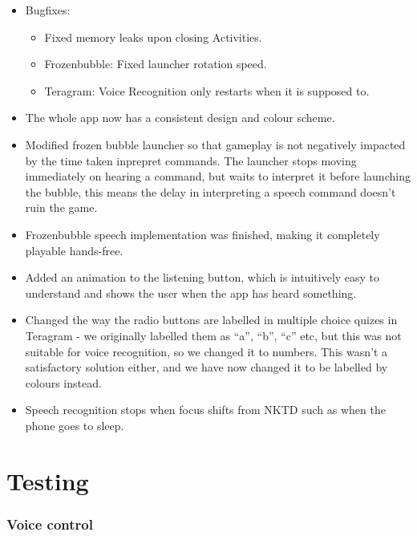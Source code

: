 \documentclass[11pt, oneside]{article}
\begin{document}
\begin{itemize}

\item Bugfixes:
\begin{itemize}
	\item Fixed memory leaks upon closing Activities.
	\item Frozenbubble: Fixed launcher rotation speed.
	\item Teragram: Voice Recognition only restarts when it is
          supposed to.
\end{itemize}

\item The whole app now has a consistent design and colour scheme.

\item Modified frozen bubble launcher so that gameplay is not
  negatively impacted by the time taken inprepret commands. The
  launcher stops moving immediately on hearing a command, but waits to
  interpret it before launching the bubble, this means the delay in
  interpreting a speech command doesn't ruin the game.

\item Frozenbubble speech implementation was finished, making it
  completely playable hands-free.

\item Added an animation to the listening button, which is intuitively
  easy to understand and shows the user when the app has heard
  something.

\item Changed the way the radio buttons are labelled in multiple
  choice quizes in Teragram - we originally labelled them as ``a'',
  ``b'', ``c'' etc, but this was not suitable for voice recognition,
  so we changed it to numbers. This wasn't a satisfactory solution
  either, and we have now changed it to be labelled by colours
  instead.

\item Speech recognition stops when focus shifts from NKTD such as
  when the phone goes to sleep.
\end{itemize}

\pagebreak

\section{Testing}

\subsubsection*{Voice control}
\end{document}
